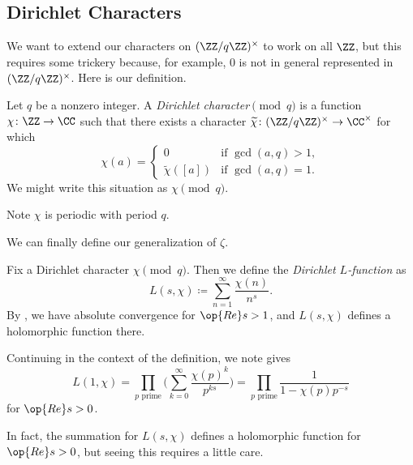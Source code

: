 \documentclass[../notes.tex]{subfiles}
\begin{document}
\subsection{Dirichlet Characters}
We want to extend our characters on $(\ZZ/q\ZZ)^\times$ to work on all $\ZZ$, but this requires some trickery because, for example, $0$ is not in general represented in $(\ZZ/q\ZZ)^\times$. Here is our definition.
\begin{definition}
	Let $q$ be a nonzero integer. A \textit{Dirichlet character$\pmod q$} is a function $\chi\colon\ZZ\to\CC$ such that there exists a character $\widetilde\chi\colon(\ZZ/q\ZZ)^\times\to\CC^\times$ for which
	\[\chi(a)=\begin{cases}
		0 & \text{if }\gcd(a,q)>1, \\
		\widetilde\chi([a]) & \text{if }\gcd(a,q)=1.
	\end{cases}\]
	We might write this situation as $\chi\pmod q$.
\end{definition}
\begin{remark}
	Note $\chi$ is periodic with period $q$.
\end{remark}
We can finally define our generalization of $\zeta$.
\begin{definition}
	Fix a Dirichlet character $\chi\pmod q$. Then we define the \textit{Dirichlet $L$-function} as
	\[L(s,\chi)\coloneqq\sum_{n=1}^\infty\frac{\chi(n)}{n^s}.\]
	By , we have absolute convergence for $\op{Re}s>1$, and $L(s,\chi)$ defines a holomorphic function there.
\end{definition}
\begin{remark}
	Continuing in the context of the definition, we note  gives
	\[L(1,\chi)=\prod_{p\text{ prime}}\Bigg(\sum_{k=0}^\infty\frac{\chi(p)^k}{p^{ks}}\Bigg)=\prod_{p\text{ prime}}\frac1{1-\chi(p)p^{-s}}\]
	for $\op{Re}s>0$.
\end{remark}
In fact, the summation for $L(s,\chi)$ defines a holomorphic function for $\op{Re}s>0$, but seeing this requires a little care.
\end{document}
